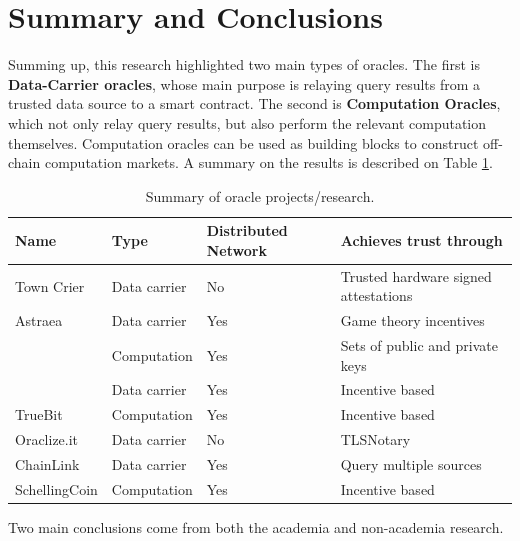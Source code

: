 \section{Summary and Conclusions}

Summing up, this research highlighted two main types of oracles. The first is \textbf{Data-Carrier oracles}, whose main purpose is relaying query results from a trusted data source to a smart contract. The second is \textbf{Computation Oracles}, which not only relay query results, but also perform the relevant computation themselves. Computation oracles can be used as building blocks to construct off-chain computation markets. A summary on the results is described on Table \ref{oracle-summary}.

\begin{table}[]
\centering
\begin{tabular}{llll}
\hline
Name                   & Type         & Distributed Network & Achieves trust through               \\ \hline
Town Crier                         & Data carrier & No                  & Trusted hardware signed attestations \\
Astraea                            & Data carrier & Yes                 & Game theory incentives               \\
\cite{Gordon2017ProvenanceSensorsb}       & Computation  & Yes                 & Sets of public and private keys      \\
\cite{MontotoMonroy2018BitcoinBlockchain} & Data carrier & Yes                 & Incentive based                          \\
TrueBit                            & Computation  & Yes                 & Incentive based                      \\
Oraclize.it                        & Data carrier & No                  & TLSNotary                            \\
ChainLink                          & Data carrier & Yes                 & Query multiple sources               \\
SchellingCoin                      & Computation  & Yes                 & Incentive based                      \\ \hline
\end{tabular}
\caption{Summary of oracle projects/research.}
\label{oracle-summary}
\end{table}

Two main conclusions come from both the academia and non-academia research. 

